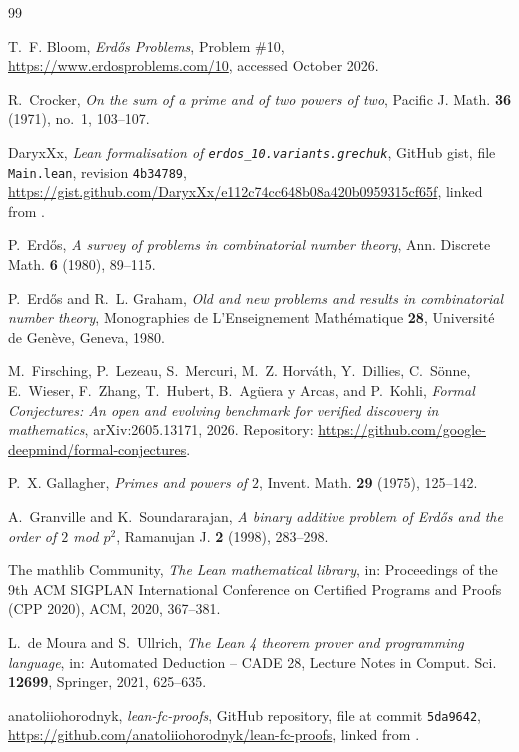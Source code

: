 \documentclass[11pt]{amsart}
\theoremstyle{plain}
\theoremstyle{definition}
\begin{document}
\begin{thebibliography}{99}

T.~F. Bloom, \emph{Erd\H{o}s Problems}, Problem \#10, \url{https://www.erdosproblems.com/10}, accessed October 2026.

R.~Crocker, \emph{On the sum of a prime and of two powers of two}, Pacific J. Math. \textbf{36} (1971), no.~1, 103--107.

DaryxXx, \emph{Lean formalisation of \texttt{erdos\_10.variants.grechuk}}, GitHub gist, file \texttt{Main.lean}, revision \texttt{4b34789}, \url{https://gist.github.com/DaryxXx/e112c74cc648b08a420b0959315cf65f}, linked from \cite{FC}.

P.~Erd\H{o}s, \emph{A survey of problems in combinatorial number theory}, Ann. Discrete Math. \textbf{6} (1980), 89--115.

P.~Erd\H{o}s and R.~L. Graham, \emph{Old and new problems and results in combinatorial number theory}, Monographies de L'Enseignement Math\'ematique \textbf{28}, Universit\'e de Gen\`eve, Geneva, 1980.

M.~Firsching, P.~Lezeau, S.~Mercuri, M.~Z. Horv\'ath, Y.~Dillies, C.~S\"onne, E.~Wieser, F.~Zhang, T.~Hubert, B.~Ag\"uera y Arcas, and P.~Kohli, \emph{Formal Conjectures: An open and evolving benchmark for verified discovery in mathematics}, arXiv:2605.13171, 2026. Repository: \url{https://github.com/google-deepmind/formal-conjectures}.

P.~X. Gallagher, \emph{Primes and powers of $2$}, Invent. Math. \textbf{29} (1975), 125--142.

A.~Granville and K.~Soundararajan, \emph{A binary additive problem of Erd\H{o}s and the order of $2$ mod $p^2$}, Ramanujan J. \textbf{2} (1998), 283--298.

The mathlib Community, \emph{The Lean mathematical library}, in: Proceedings of the 9th ACM SIGPLAN International Conference on Certified Programs and Proofs (CPP 2020), ACM, 2020, 367--381.

L.~de Moura and S.~Ullrich, \emph{The Lean 4 theorem prover and programming language}, in: Automated Deduction -- CADE 28, Lecture Notes in Comput. Sci. \textbf{12699}, Springer, 2021, 625--635.

anatoliiohorodnyk, \emph{lean-fc-proofs}, GitHub repository, file  at commit \texttt{5da9642}, \url{https://github.com/anatoliiohorodnyk/lean-fc-proofs}, linked from \cite{FC}.

\end{thebibliography}
\end{document}
